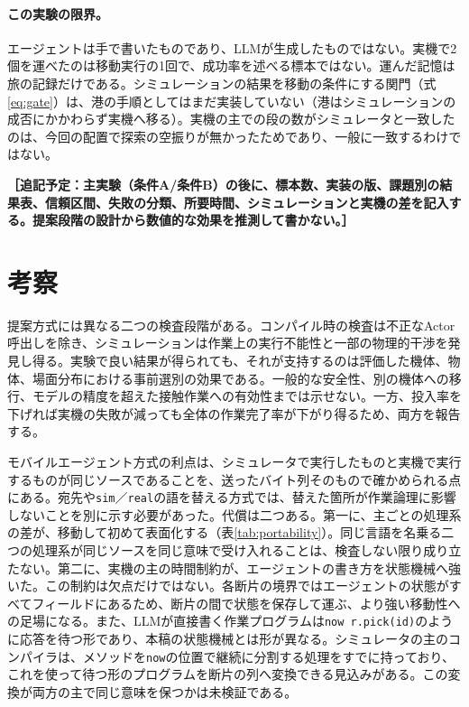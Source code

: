 \documentclass[10pt,letterpaper]{article}
\newcommand{\todo}[1]{\textbf{［追記予定：#1］}}
\begin{document}
\paragraph{この実験の限界。}エージェントは手で書いたものであり、LLMが生成したものではない。実機で2個を運べたのは移動実行の1回で、成功率を述べる標本ではない。運んだ記憶は旅の記録だけである。シミュレーションの結果を移動の条件にする関門（式\eqref{eq:gate}）は、港の手順としてはまだ実装していない（港はシミュレーションの成否にかかわらず実機へ移る）。実機の主での段の数がシミュレータと一致したのは、今回の配置で探索の空振りが無かったためであり、一般に一致するわけではない。

\todo{主実験（条件A/条件B）の後に、標本数、実装の版、課題別の結果表、信頼区間、失敗の分類、所要時間、シミュレーションと実機の差を記入する。提案段階の設計から数値的な効果を推測して書かない。}

\section{考察}
提案方式には異なる二つの検査段階がある。コンパイル時の検査は不正なActor呼出しを除き、シミュレーションは作業上の実行不能性と一部の物理的干渉を発見し得る。実験で良い結果が得られても、それが支持するのは評価した機体、物体、場面分布における事前選別の効果である。一般的な安全性、別の機体への移行、モデルの精度を超えた接触作業への有効性までは示せない。一方、投入率を下げれば実機の失敗が減っても全体の作業完了率が下がり得るため、両方を報告する。

モバイルエージェント方式の利点は、シミュレータで実行したものと実機で実行するものが同じソースであることを、送ったバイト列そのもので確かめられる点にある。宛先や\texttt{sim}／\texttt{real}の語を替える方式では、替えた箇所が作業論理に影響しないことを別に示す必要があった。代償は二つある。第一に、主ごとの処理系の差が、移動して初めて表面化する（表\ref{tab:portability}）。同じ言語を名乗る二つの処理系が同じソースを同じ意味で受け入れることは、検査しない限り成り立たない。第二に、実機の主の時間制約が、エージェントの書き方を状態機械へ強いた。この制約は欠点だけではない。各断片の境界ではエージェントの状態がすべてフィールドにあるため、断片の間で状態を保存して運ぶ、より強い移動性への足場になる。また、LLMが直接書く作業プログラムは\texttt{now r.pick(id)}のように応答を待つ形であり、本稿の状態機械とは形が異なる。シミュレータの主のコンパイラは、メソッドを\texttt{now}の位置で継続に分割する処理をすでに持っており、これを使って待つ形のプログラムを断片の列へ変換できる見込みがある。この変換が両方の主で同じ意味を保つかは未検証である。
\end{document}
